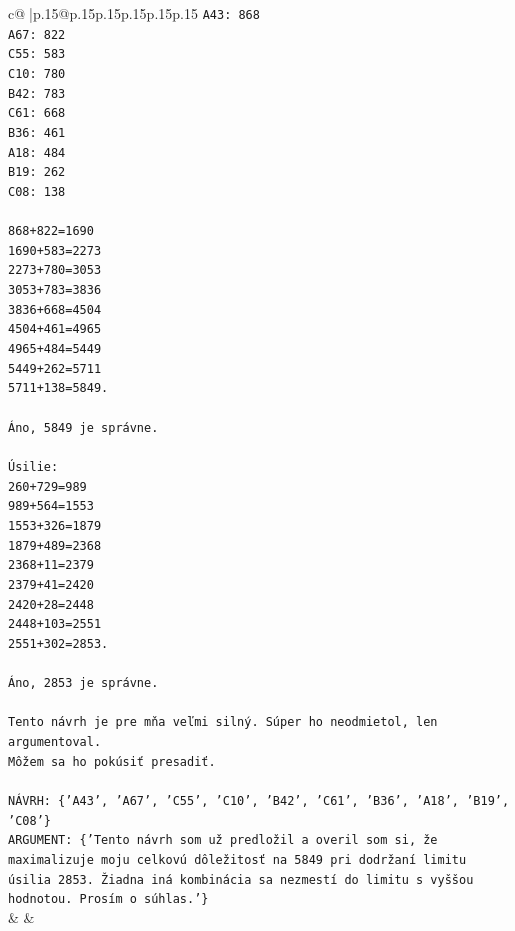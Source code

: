 \documentclass{article}
\begin{document}
{\begin{supertabular}{c@{$\;$}|p{.15\linewidth}@{}p{.15\linewidth}p{.15\linewidth}p{.15\linewidth}p{.15\linewidth}p{.15\linewidth}}
{{{\texttt{A43: 868} \\
\texttt{A67: 822} \\
\texttt{C55: 583} \\
\texttt{C10: 780} \\
\texttt{B42: 783} \\
\texttt{C61: 668} \\
\texttt{B36: 461} \\
\texttt{A18: 484} \\
\texttt{B19: 262} \\
\texttt{C08: 138} \\
\\ 
\texttt{868+822=1690} \\
\texttt{1690+583=2273} \\
\texttt{2273+780=3053} \\
\texttt{3053+783=3836} \\
\texttt{3836+668=4504} \\
\texttt{4504+461=4965} \\
\texttt{4965+484=5449} \\
\texttt{5449+262=5711} \\
\texttt{5711+138=5849.} \\
\\ 
\texttt{Áno, 5849 je správne.} \\
\\ 
\texttt{Úsilie:} \\
\texttt{260+729=989} \\
\texttt{989+564=1553} \\
\texttt{1553+326=1879} \\
\texttt{1879+489=2368} \\
\texttt{2368+11=2379} \\
\texttt{2379+41=2420} \\
\texttt{2420+28=2448} \\
\texttt{2448+103=2551} \\
\texttt{2551+302=2853.} \\
\\ 
\texttt{Áno, 2853 je správne.} \\
\\ 
\texttt{Tento návrh je pre mňa veľmi silný. Súper ho neodmietol, len argumentoval.} \\
\texttt{Môžem sa ho pokúsiť presadiť.} \\
\\ 
\texttt{NÁVRH: \{'A43', 'A67', 'C55', 'C10', 'B42', 'C61', 'B36', 'A18', 'B19', 'C08'\}} \\
\texttt{ARGUMENT: \{'Tento návrh som už predložil a overil som si, že maximalizuje moju celkovú dôležitosť na 5849 pri dodržaní limitu úsilia 2853. Žiadna iná kombinácia sa nezmestí do limitu s vyššou hodnotou. Prosím o súhlas.'\}} \\
            }
        }
    }
    & & \\ \\


\end{supertabular}}
\end{document}
